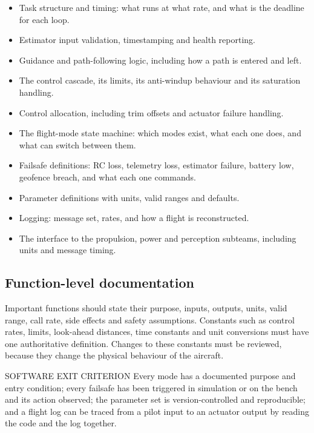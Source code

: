\documentclass[11pt,a4paper]{article}
\begin{document}
\begin{itemize}
  \item Task structure and timing: what runs at what rate, and what is the deadline for each loop.
  \item Estimator input validation, timestamping and health reporting.
  \item Guidance and path-following logic, including how a path is entered and left.
  \item The control cascade, its limits, its anti-windup behaviour and its saturation handling.
  \item Control allocation, including trim offsets and actuator failure handling.
  \item The flight-mode state machine: which modes exist, what each one does, and what can switch between them.
  \item Failsafe definitions: RC loss, telemetry loss, estimator failure, battery low, geofence breach, and what each one commands.
  \item Parameter definitions with units, valid ranges and defaults.
  \item Logging: message set, rates, and how a flight is reconstructed.
  \item The interface to the propulsion, power and perception subteams, including units and message timing.
\end{itemize}

\subsection{Function-level documentation}

Important functions should state their purpose, inputs, outputs, units, valid
range, call rate, side effects and safety assumptions. Constants such as
control rates, limits, look-ahead distances, time constants and unit
conversions must have one authoritative definition. Changes to these constants
must be reviewed, because they change the physical behaviour of the aircraft.

\begin{callout}{SOFTWARE EXIT CRITERION}
  Every mode has a documented purpose and entry condition; every failsafe has
  been triggered in simulation or on the bench and its action observed; the
  parameter set is version-controlled and reproducible; and a flight log can be
  traced from a pilot input to an actuator output by reading the code and the
  log together.
\end{callout}
\end{document}

